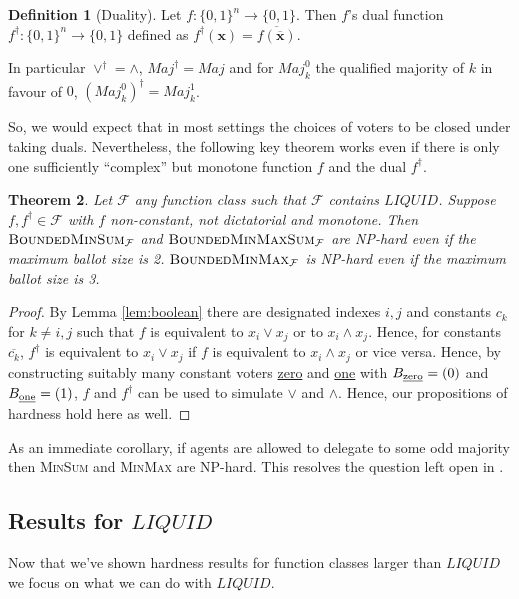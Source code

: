 \documentclass[11pt,a4paper, titlepage]{article}
\newtheorem{theorem}{Theorem}
\theoremstyle{definition}
\newtheorem{definition}[theorem]{Definition}
\let\vec\mathbf
\newcommand{\BMM}{\textsc{BoundedMinMax}}
\newcommand{\BMS}{\textsc{BoundedMinSum}}
\newcommand{\BMMS}{\textsc{BoundedMinMaxSum}}
\newcommand{\Maj}{\mathit{Maj}}
\newcommand{\LIQUID}{\mathit{LIQUID}}
\begin{document}
\begin{definition}[Duality]
    Let $f \colon \{0, 1\}^n \longrightarrow \{0, 1\}$. Then $f$'s dual function $f^\dagger \colon \{0, 1\}^n \longrightarrow \{0, 1\}$ defined as $f^\dagger(\vec{x}) = \overline{f(\overline{\vec{x}})}$.
\end{definition}

In particular $\lor^\dagger = \land$, $\Maj^\dagger= \Maj$ and for $\Maj_k^0$ the qualified majority of $k$ in favour of $0$, $(\Maj_k^0)^\dagger = \Maj_k^1$.

So, we would expect that in most settings the choices of voters to be closed under taking duals.
Nevertheless, the following key theorem works even if there is only one sufficiently ``complex'' but monotone function $f$ and the dual $f^\dagger$.

\begin{theorem}
    Let $\mathcal{F}$ any function class such that $\mathcal{F}$ contains $\LIQUID$. Suppose $f, f^\dagger \in \mathcal{F}$ with $f$ non-constant, not dictatorial and monotone.
    Then $\BMS_\mathcal{F}$ and $\BMMS_\mathcal{F}$ are NP-hard even if the maximum ballot size is 2. $\BMM_{\mathcal{F}}$ is NP-hard even if the maximum ballot size is 3.
\end{theorem}

\begin{proof}
    By Lemma \ref{lem:boolean} there are designated indexes $i, j$ and constants $c_k$ for $k \neq i, j$ such that $f$ is equivalent to $x_i \lor x_j$ or to $x_i \land x_j$.
    Hence, for constants $\overline{c_k}$, $f^\dagger$ is equivalent to $x_i \lor x_j$ if $f$ is equivalent to $x_i \land x_j$ or vice versa.
    Hence, by constructing suitably many constant voters \underline{zero} and \underline{one} with $B_{\text{\underline{zero}}} = (0)$ and $B_{\text{\underline{one}}} = (1)$, $f$ and $f^\dagger$ can be used to simulate $\lor$ and $\land$.
    Hence, our propositions of hardness hold here as well.
\end{proof}

As an immediate corollary, if agents are allowed to delegate to some odd majority then \textsc{MinSum} and \textsc{MinMax} are NP-hard.
This resolves the question left open in \citet{grandi}.

\subsection{Results for $\LIQUID$}

Now that we've shown hardness results for function classes larger than $\LIQUID$ we focus on what we can do with $\LIQUID$.
\end{document}
